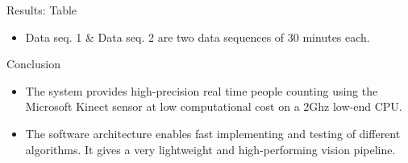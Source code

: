 \documentclass[final,hyperref={pdfpagelabels=false}]{beamer}
\begin{document}
\begin{frame}[t]
\begin{columns}[t]
\begin{column}{.465\textwidth}
\begin{block}{Results: Table}
\begin{itemize}
\item Data seq. 1 \& Data seq. 2 are two data sequences of 30 minutes each. 
\end{itemize}
     
\end{block}






\begin{block}{Conclusion}

\begin{itemize}
\item The system provides high-precision real time people counting using the Microsoft Kinect sensor at low computational cost on a 2Ghz low-end CPU.
\item The software architecture enables fast implementing and testing of different algorithms. It gives a very lightweight and high-performing vision pipeline. 
\end{itemize}
\vspace*{0.012\textheight} %
\end{block}

%
%        
%
%
%
%
%


\end{column}
\end{columns}
\end{frame}
\end{document}
